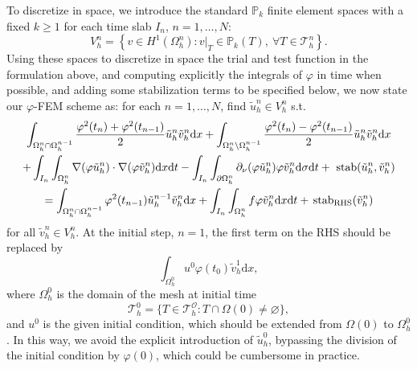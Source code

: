 \documentclass[11pt,a4paper]{article}
\theoremstyle{plain}
\theoremstyle{definition}
\theoremstyle{remark}
\numberwithin{equation}{section}
\newcommand{\dx}{\mathrm{d}x}
\newcommand{\dsigma}{\mathrm{d}\sigma}
\newcommand{\dt}{\mathrm{d}t}
\begin{document}
To discretize in space, we introduce the standard {$\mathbb{P}_k$} finite
element spaces with a fixed  $k \geqslant 1$ for each time slab $I_n$, $n = 1, \ldots, N$:
\[ V_h^n =\left\{v \in H^1 (\Omega^n_h) : v|_T \in \mathbb{P}_k (T),   \ \forall T \in \mathcal{T}^n_h \right\} . \]
Using these spaces to discretize in space the trial and test function in the formulation above, and computing explicitly the integrals of $\varphi$ in time when possible, {and adding some stabilization terms to be specified below,} we now state our $\varphi$-FEM scheme as: for each $n = 1, \ldots,
N$, find $\tilde{u}_h^n \in V_h^n$ s.t.
\begin{multline}\label{Eq:scheme}
  \int_{\Omega_h^n \cap \Omega_h^{n - 1}} \frac{\varphi^2 (t_n) + \varphi^2 (t_{n
  - 1})}{2}  \tilde{u}_h^n  \tilde{v}_h^n \dx + \int_{\Omega_h^n
  \setminus \Omega_h^{n - 1}} \frac{\varphi^2 (t_n) - \varphi^2 (t_{n - 1})}{2}
  \tilde{u}_h^n  \tilde{v}_h^n \dx \\
  + \int_{I_n} \int_{\Omega_h^n} \nabla (\varphi \tilde{u}^n_h) \cdot \nabla
  (\varphi \tilde{v}_h^n) \dx \dt - \int_{I_n} \int_{\partial
  \Omega_h^n} \partial_{\nu}{(\varphi \tilde{u}^n_h)} \varphi  \tilde{v}_h^n
  \dsigma \dt + \ \text{stab} (\tilde{u}_h^n,
  \tilde{v}_h^n)  \\
   = \int_{\Omega_h^n \cap \Omega_h^{n - 1}} \varphi^2 (t_{n - 1})
  \tilde{u}_h^{n - 1}  \tilde{v}_h^n \dx + \int_{I_n} \int_{\Omega_h^n}
  f \varphi \tilde{v}_h^n \dx \dt + \hspace{0.17em}
  \text{stab}_{\text{RHS}} (\tilde{v}_h^n)
\end{multline}
for all $\tilde{v}_h^n \in V_h^n$. At the initial step, $n = 1$, the first term on the RHS should be replaced by
\[ \int_{\Omega_h^0} u^0 \varphi (t_0)  \tilde{v}_h^1 \dx, \]
where $\Omega_h^0$ is the domain of the mesh at initial time
\[ \mathcal{T}_h^0 = \{T \in \mathcal{T}_h^{\mathcal{O}} : T \cap \Omega (0)
   \neq \varnothing\} , \]
{and} $u^0$ is the given initial condition, which should be extended from
$\Omega (0)$ to $\Omega_h^0$. In this way, we avoid the explicit introduction of $\tilde{u}_h^0$, bypassing the division of the initial condition by $\varphi (0)$, which could be cumbersome in practice. %
\end{document}
